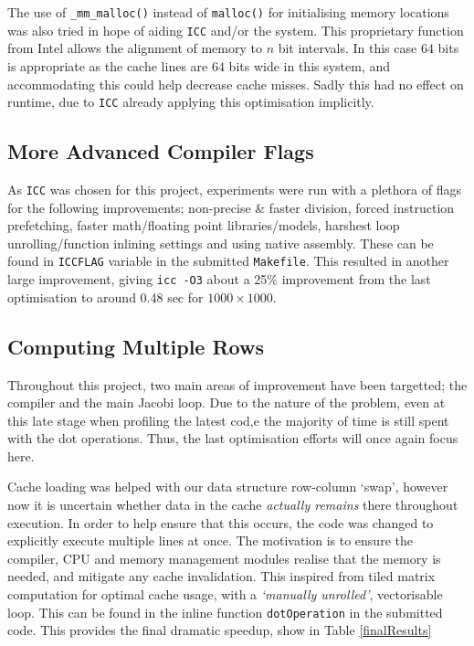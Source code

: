 \documentclass[10pt,twocolumn,a4paper]{article}
\def\tm{\texttrademark\xspace}
\begin{document}
The use of \texttt{\_mm\_malloc()} instead of \texttt{malloc()} for initialising memory locations was also tried in hope of aiding \texttt{ICC} and/or the system. This proprietary function from Intel\tm allows the alignment of memory to $n$ bit intervals. In this case $64$ bits is appropriate as the cache lines are $64$ bits wide in this system, and accommodating this could help decrease cache misses. Sadly this had no effect on runtime, due to \texttt{ICC} already applying this optimisation implicitly. \par

\subsection{More Advanced Compiler Flags}
As \texttt{ICC} was chosen for this project, experiments were run with a plethora of flags for the following improvements; non-precise \& faster division, forced instruction prefetching, faster math/floating point libraries/models, harshest loop unrolling/function inlining settings and using native assembly. These can be found in \texttt{ICCFLAG} variable in the submitted \texttt{Makefile}. This resulted in another large improvement, giving \texttt{icc -O3} about a 25\% improvement from the last optimisation to around 0.48 sec for $1000\times1000$. \par

\subsection{Computing Multiple Rows}
Throughout this project, two main areas of improvement have been targetted; the compiler and the main Jacobi loop. Due to the nature of the problem, even at this late stage when profiling the latest cod,e the majority of time is still spent with the dot operations. Thus, the last optimisation efforts will once again focus here. \par

Cache loading was helped with our data structure row-column `swap', however now it is uncertain whether data in the cache \textit{actually remains} there throughout execution. In order to help ensure that this occurs, the code was changed to explicitly execute multiple lines at once. The motivation is to ensure the compiler, CPU and memory management modules realise that the memory is needed, and mitigate any cache invalidation. This inspired from tiled matrix computation for optimal cache usage, with a \textit{`manually unrolled'}, vectorisable loop. This can be found in the inline function \texttt{dotOperation} in the submitted code. This provides the final dramatic speedup, show in Table \ref{finalResults} \par
\end{document}
